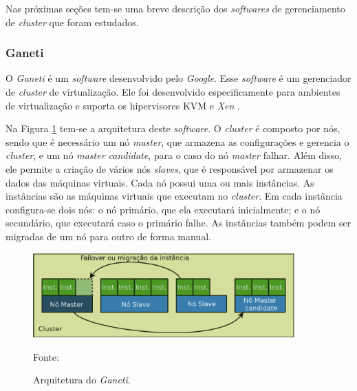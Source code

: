 Nas próximas seções tem-se uma breve descrição dos \textit{softwares} de gerenciamento de \textit{cluster} que foram estudados.


\subsubsection{Ganeti}
\label{section:ganeti}
O \textit{Ganeti} \cite{ganeti} é um \textit{software} desenvolvido pelo \textit{Google}. Esse \textit{software} é um gerenciador de 
\textit{cluster} de virtualização. Ele foi desenvolvido especificamente para ambientes de virtualização e suporta os hipervisores 
\ac{KVM} \cite{kvm} e \textit{Xen} \cite{xen}. 

Na Figura \ref{fig:ganeti_arquitetura} tem-se a arquitetura deste \textit{software}. 
O \textit{cluster} é composto por nós, sendo que é necessário um nó \textit{master}, que armazena as configurações e gerencia o \textit{cluster}, 
e um nó \textit{master candidate}, para o caso do nó \textit{master} falhar. Além disso, ele permite a criação de vários nós \textit{slaves}, 
que é responsável por armazenar os dados das máquinas virtuais.
Cada nó possui uma ou mais instâncias. As instâncias são as máquinas virtuais que executam no \textit{cluster}. Em cada instância configura-se 
dois nós: o nó primário, que ela executará inicialmente; e o nó secundário, que executará caso o primário falhe.
As instâncias também podem ser migradas de um nó para outro de forma manual. 

\begin{figure}[h!]
 \centering
 \includegraphics[width=380px]{img/ganeti_arquitetura.eps}
 \caption{Arquitetura do \textit{Ganeti}.}
 Fonte: \citet{carvalho2011}
 \label{fig:ganeti_arquitetura}
\end{figure}

